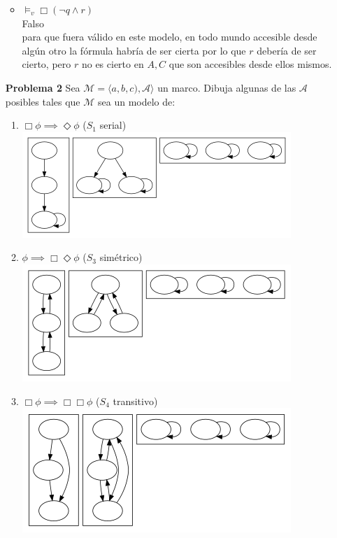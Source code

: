 \documentclass{article}
\begin{document}
\begin{enumerate}
\begin{itemize}
\item $\models_v \Box (\neg q \wedge r)$\\
Falso\\
para que fuera válido en este modelo, en todo mundo accesible desde algún otro la fórmula habría de ser cierta por lo que $r$ debería de ser cierto, pero $r$ no es cierto en ${A,C}$ que son accesibles desde ellos mismos.
\end{itemize}

\item[\bf{Problema 2}] Sea $\mathcal{M} = \langle {a,b,c}), \mathcal{A} \rangle$ un marco. Dibuja algunas de las $\mathcal{A}$ posibles tales que $\mathcal{M}$ sea un modelo de:\\

\begin{enumerate}
\item $\Box\phi \implies \Diamond \phi$ ($S_1$  serial)\\
  \includegraphics{e2a.png}\\

\item $\phi \implies \Box\Diamond \phi$ ($S_3$ simétrico)\\
  \includegraphics{e2b.png}\\

\newpage
\item $\Box\phi \implies \Box\Box\phi$ ($S_4$ transitivo)\\
  \includegraphics{e2c.png}\\


\end{enumerate}
\end{enumerate}
\end{document}

